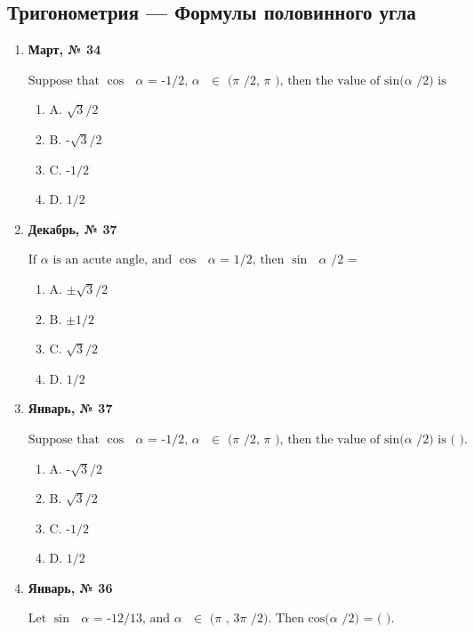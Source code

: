 \subsection*{Тригонометрия — Формулы половинного угла}
\begin{enumerate}
\item \textbf{Март, № 34} \par \smallskip
$\displaystyle \text{Suppose that }\cos\text{ }\alpha\text{  = -1/2, }\alpha\text{  }\in\text{  (}\pi\text{ /2, }\pi\text{ ), then the value of sin(}\alpha\text{ /2) is}$
\begin{enumerate}
\item $\displaystyle \text{A. }\sqrt{3}\text{/2}$
\item $\displaystyle \text{B. -}\sqrt{3}\text{/2}$
\item $\displaystyle \text{C. -1/2}$
\item $\displaystyle \text{D. 1/2}$
\end{enumerate}
\item \textbf{Декабрь, № 37} \par \smallskip
$\displaystyle \text{If }\alpha\text{  is an acute angle, and }\cos\text{ }\alpha\text{  = 1/2, then }\sin\text{ }\alpha\text{ /2 =}$
\begin{enumerate}
\item $\displaystyle \text{A. ±}\sqrt{3}\text{/2}$
\item $\displaystyle \text{B. ±1/2}$
\item $\displaystyle \text{C. }\sqrt{3}\text{/2}$
\item $\displaystyle \text{D. 1/2}$
\end{enumerate}
\item \textbf{Январь, № 37} \par \smallskip
$\displaystyle \text{Suppose that }\cos\text{ }\alpha\text{  = -1/2, }\alpha\text{  }\in\text{  (}\pi\text{ /2, }\pi\text{ ), then the value of sin(}\alpha\text{ /2) is ( ).}$
\begin{enumerate}
\item $\displaystyle \text{A. -}\sqrt{3}\text{/2}$
\item $\displaystyle \text{B. }\sqrt{3}\text{/2}$
\item $\displaystyle \text{C. -1/2}$
\item $\displaystyle \text{D. 1/2}$
\end{enumerate}
\item \textbf{Январь, № 36} \par \smallskip
$\displaystyle \text{Let }\sin\text{ }\alpha\text{  = -12/13, and }\alpha\text{  }\in\text{  (}\pi\text{ , 3}\pi\text{ /2). Then cos(}\alpha\text{ /2) = ( ).}$

\end{enumerate}
